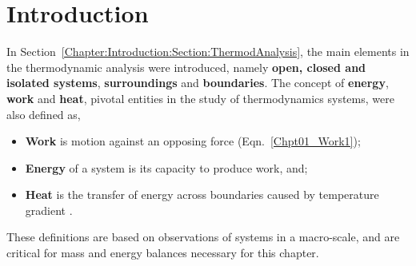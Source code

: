    
     \section{Introduction}\label{Chapter:FirstLaw:Section:Intro}
     In Section~\ref{Chapter:Introduction:Section:ThermodAnalysis}, the main elements in the thermodynamic analysis were introduced, namely {\bf open, closed and isolated systems}, {\bf surroundings} and {\bf boundaries}. The concept of {\bf energy}, {\bf work} and {\bf heat}, pivotal entities in the study of thermodynamics systems, were also defined as,
     \begin{itemize}
        \item {\bf Work} is motion against an opposing force (Eqn.~\ref{Chpt01_Work1});
        \item {\bf Energy} of a system is its capacity to produce work, and; 
        \item {\bf Heat} is the transfer of energy across boundaries caused by temperature gradient \citep{Devoe_Book}.
     \end{itemize}
     These definitions are based on observations of systems in a macro-scale, and are critical for mass and energy balances necessary for this chapter. 

